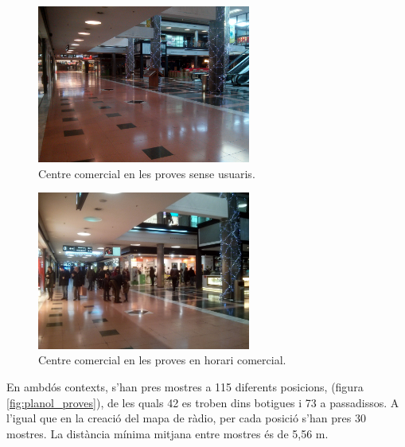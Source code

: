 \begin{figure}[ht]
\begin{center}
\includegraphics[width=7cm]{imatges/foto_buit.jpg}
\caption{Centre comercial en les proves sense usuaris.}
\label{fig:foto_buit}
\end{center}
\end{figure}

\begin{figure}[ht]
\begin{center}
\includegraphics[width=7cm]{imatges/foto_ple.jpg}
\caption{Centre comercial en les proves en horari comercial.}
\label{fig:foto_ple}
\end{center}
\end{figure}

En ambdós contexts, s'han pres mostres a 115 diferents posicions, (figura \ref{fig:planol_proves}), de les quals 42 es troben dins botigues i 73 a passadissos. A l'igual que en la creació del mapa de ràdio, per cada posició s'han pres 30 mostres. La distància mínima mitjana entre mostres és de 5,56 m.


